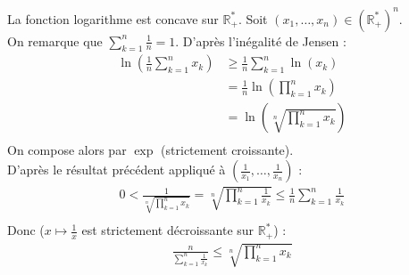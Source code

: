 \documentclass[../main.tex]{subfiles}
\begin{document}
\noindent La fonction logarithme est concave sur $\mathbb{R}_+^*$. Soit $(x_1, \ldots, x_n) \in (\mathbb{R}_+^*)^n$. \\
On remarque que $\sum\limits_{k=1}^{n} \frac{1}{n} = 1$. D'après l'inégalité de Jensen :
\begin{align*}
    \ln \left( \frac{1}{n} \sum_{k=1}^{n} x_k \right) &\geq \frac{1}{n} \sum_{k=1}^{n} \ln(x_k) \\
    &= \frac{1}{n} \ln \left( \prod_{k=1}^{n} x_k \right) \\
    &= \ln \left( \sqrt[n]{\prod_{k=1}^{n} x_k} \right) \\
\end{align*} 
On compose alors par $\exp$ (strictement croissante). \\
D'après le résultat précédent appliqué à $\left( \frac{1}{x_1}, \ldots, \frac{1}{x_n} \right)$ : 
\begin{align*}
    0 < \frac{1}{\sqrt[n]{\prod\limits_{k=1}^{n} x_k}} = \sqrt[n]{\prod_{k=1}^{n} \frac{1}{x_k}} \leq \frac{1}{n} \sum_{k=1}^{n} \frac{1}{x_k} \\
\end{align*}
Donc ($x\mapsto \frac{1}{x}$ est strictement décroissante sur $\mathbb{R}_+^*$) :
\begin{align*}
    \frac{n}{\sum\limits_{k=1}^{n} \frac{1}{x_k}} \leq \sqrt[n]{\prod_{k=1}^{n} x_k}
\end{align*}
\end{document}

